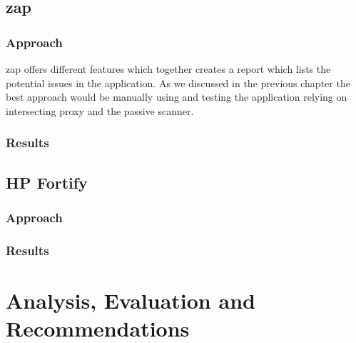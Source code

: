 \documentclass[11pt,english,a4paper]{report}
\begin{document}
\section{\gls{zap}}
\subsection{Approach}
\gls{zap} offers different features which together creates a report which lists the potential issues in the application. 
As we discussed in the previous chapter the best approach would be manually using and testing the application relying on intersecting proxy and the passive scanner. 

\subsection{Results}
\section{HP Fortify}
\subsection{Approach}
\subsection{Results}

\chapter{Analysis, Evaluation and Recommendations}

\newpage




\end{document}
